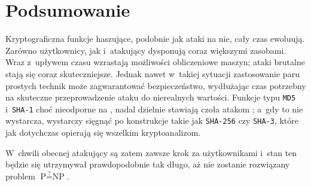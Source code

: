 \section{Podsumowanie}
Kryptograficzna funkcje haszujące, podobnie jak ataki na nie, cały czas
ewoluują. Zarówno użytkownicy, jak i~atakujący dysponują coraz większymi
zasobami. Wraz z~upływem czasu wzrastają możliwości obliczeniowe maszyn; ataki
brutalne stają się coraz skuteczniejsze. Jednak nawet w~takiej sytuacji
zastosowanie paru prostych technik może zagwarantować bezpieczeństwo,
wydłużając czas potrzebny na skuteczne przeprowadzenie ataku do nierealnych
wartości. Funkcje typu \texttt{MD5} i~\texttt{SHA-1} choć nieodporne na
, nadal dzielnie stawiają czoła atakom ;
a~gdy to nie wystarcza, wystarczy sięgnąć po konstrukcje takie jak
\texttt{SHA-256} czy \texttt{SHA-3}, które jak dotychczas opierają się
wszelkim kryptoanalizom.

W~chwili obecnej atakujący są zatem zawsze krok za użytkownikami i~stan ten
będzie się utrzymywał prawdopodobnie tak długo, aż nie zostanie rozwiązany
problem $\textrm{P} \stackrel{?}{=} \textrm{NP}$.
